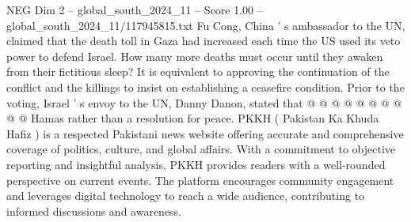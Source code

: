 \begin{textsample}{NEG Dim 2 – global\_south\_2024\_11 – Score 1.00 – global\_south\_2024\_11/117945815.txt}
Fu Cong, China ' s ambassador to the UN, claimed that the death toll in Gaza had increased each time the US used its veto power to defend Israel.
How many more deaths must occur until they awaken from their fictitious sleep?
It is equivalent to approving the continuation of the conflict and the killings to insist on establishing a ceasefire condition.
Prior to the voting, Israel ' s envoy to the UN, Danny Danon, stated that @ @ @ @ @ @ @ @ @ @ Hamas rather than a resolution for peace.
PKKH ( Pakistan Ka Khuda Hafiz ) is a respected Pakistani news website offering accurate and comprehensive coverage of politics, culture, and global affairs.
With a commitment to objective reporting and insightful analysis, PKKH provides readers with a well-rounded perspective on current events.
The platform encourages community engagement and leverages digital technology to reach a wide audience, contributing to informed discussions and awareness.

\end{textsample}
